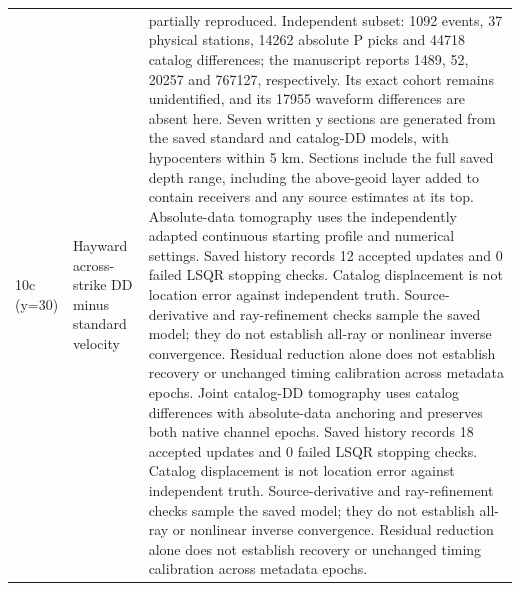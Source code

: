 \begin{longtable}{>{\raggedright\arraybackslash}p{}>{\raggedright\arraybackslash}p{}>{\raggedright\arraybackslash}p{}}
10c (y=30) & Hayward across-strike DD minus standard velocity & partially reproduced. Independent subset: 1092 events, 37 physical stations, 14262 absolute P picks and 44718 catalog differences; the manuscript reports 1489, 52, 20257 and 767127, respectively. Its exact cohort remains unidentified, and its 17955 waveform differences are absent here. Seven written y sections are generated from the saved standard and catalog-DD models, with hypocenters within 5 km. Sections include the full saved depth range, including the above-geoid layer added to contain receivers and any source estimates at its top. Absolute-data tomography uses the independently adapted continuous starting profile and numerical settings. Saved history records 12 accepted updates and 0 failed LSQR stopping checks. Catalog displacement is not location error against independent truth. Source-derivative and ray-refinement checks sample the saved model; they do not establish all-ray or nonlinear inverse convergence. Residual reduction alone does not establish recovery or unchanged timing calibration across metadata epochs. Joint catalog-DD tomography uses catalog differences with absolute-data anchoring and preserves both native channel epochs. Saved history records 18 accepted updates and 0 failed LSQR stopping checks. Catalog displacement is not location error against independent truth. Source-derivative and ray-refinement checks sample the saved model; they do not establish all-ray or nonlinear inverse convergence. Residual reduction alone does not establish recovery or unchanged timing calibration across metadata epochs.\\

\end{longtable}
